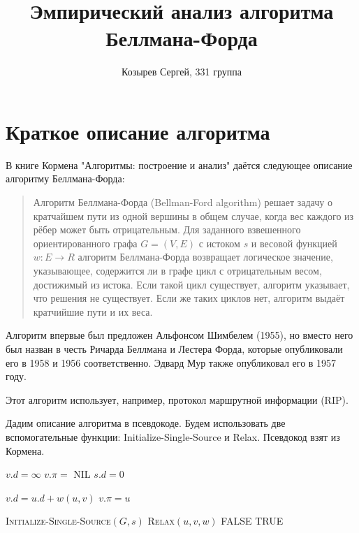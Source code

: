 \documentclass[a4paper,12pt]{article}
\newcommand{\TITLE}[1]{\item[#1]}
\begin{document}
\title{Эмпирический анализ алгоритма Беллмана-Форда}
\author{Козырев Сергей, 331 группа}
\maketitle
\newpage
\tableofcontents

\newpage
\section{Краткое описание алгоритма}
В книге Кормена "Алгоритмы: построение и анализ" даётся следующее описание 
алгоритму Беллмана-Форда:\cite[с.~688]{cormen}
\begin{quotation}
Алгоритм Беллмана-Форда (Bellman-Ford algorithm) решает задачу о кратчайшем 
пути из одной вершины в общем случае, когда вес каждого из рёбер может быть 
отрицательным.
Для заданного взвешенного ориентированного графа $G = (V, E)$ с
истоком $s$ и весовой функцией $w : E \rightarrow R$ алгоритм Беллмана-Форда 
возвращает логическое значение, указывающее, содержится ли в графе цикл с 
отрицательным весом, достижимый из истока.
Если такой цикл существует, алгоритм указывает, что решения не существует.
Если же таких циклов нет, алгоритм выдаёт кратчийшие пути и их
веса.
\end{quotation}

Алгоритм впервые был предложен Альфонсом Шимбелем (1955), но вместо него был 
назван в честь Ричарда Беллмана и Лестера Форда, которые опубликовали его в 
1958 и 1956 соответственно.
Эдвард Мур также опубликовал его в 1957 году.\cite[pp.~32-33]{schrijver}

Этот алгоритм использует, например, протокол маршрутной информации 
(RIP).\cite{semenov}

Дадим описание алгоритма в псевдокоде.
Будем использовать две вспомогательные функции: 
Initialize-Single-Source и Relax.
Псевдокод взят из Кормена.\cite[с.~686,~689]{cormen}
\begin{algorithmic}[1]
  \TITLE{\textsc{Initialize-Single-Source}$(G, s)$}
    \STATE $v.d = \infty$
    \STATE $v.\pi =$ NIL
  \ENDFOR
  \STATE $s.d = 0$
\end{algorithmic}
\begin{algorithmic}[1]
  \TITLE{\textsc{Relax}$(u, v, w)$}
    \STATE $v.d = u.d + w(u, v)$
    \STATE $v.\pi = u$
  \ENDIF
\end{algorithmic}
\begin{algorithmic}[1]
  \TITLE{\textsc{Bellman-Ford}$(G, w, s)$}
  \STATE \textsc{Initialize-Single-Source}$(G, s)$
      \STATE \textsc{Relax}$(u, v, w)$
    \ENDFOR
  \ENDFOR
      \RETURN FALSE
    \ENDIF
  \ENDFOR
  \RETURN TRUE
\end{algorithmic}
\end{document}

